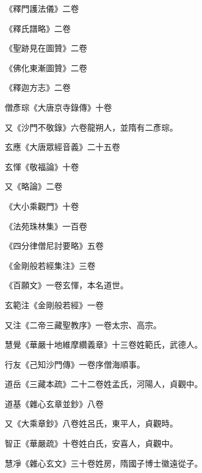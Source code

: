 \begin{pinyinscope}
 《釋門護法儀》二卷



 《釋氏譜略》二卷



 《聖跡見在圖贊》二卷



 《佛化東漸圖贊》二卷



 《釋迦方志》二卷



 僧彥琮《大唐京寺錄傳》十卷



 又《沙門不敬錄》六卷龍朔人，並隋有二彥琮。



 玄應《大唐眾經音義》二十五卷



 玄惲《敬福論》十卷



 又《略論》二卷



 《大小乘觀門》十卷



 《法苑珠林集》一百卷



 《四分律僧尼討要略》五卷



 《金剛般若經集注》三卷



 《百願文》一卷玄惲，本名道世。



 玄範注《金剛般若經》一卷



 又注《二帝三藏聖教序》一卷太宗、高宗。



 慧覺《華嚴十地維摩纘義章》十三卷姓範氏，武德人。



 行友《己知沙門傳》一卷序僧海順事。



 道岳《三藏本疏》二十二卷姓孟氏，河陽人，貞觀中。



 道基《雜心玄章並鈔》八卷



 又《大乘章鈔》八卷姓呂氏，東平人，貞觀時。



 智正《華嚴疏》十卷姓白氏，安喜人，貞觀中。



 慧凈《雜心玄文》三十卷姓房，隋國子博士徽遠從子。




\end{pinyinscope}
